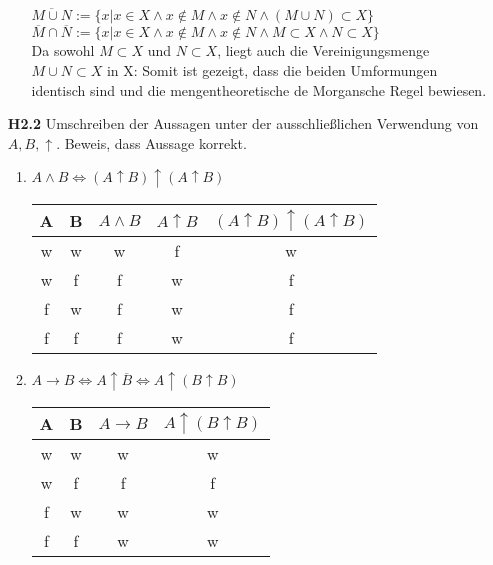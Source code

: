 \documentclass[a4paper,abstract,german]{scrreprt}
\begin{document}
\begin{enumerate}
\begin{enumerate}
        $\overline{M \cup N} := \{x|x \in X \land  x \notin M \land x \notin N \land (M \cup N) \subset X\}$ \\
        $\overline{M} \cap \overline{N} := \{ x |x \in X \land x \notin M \land x \notin N \land M \subset X \land N \subset X \}$ \\ 
        
         Da sowohl $M \subset X$ und $N\subset X$, liegt auch die Vereinigungsmenge $M \cup N \subset X$ in X:
         Somit ist gezeigt, dass die beiden Umformungen identisch sind und die mengentheoretische de Morgansche Regel bewiesen.

	\end{enumerate}
	\item[\textbf {H2.2}]
	Umschreiben der Aussagen unter der ausschließlichen Verwendung von $A, B, \uparrow$. Beweis, dass Aussage korrekt.
	\begin{enumerate}
	\item $ A \land B \iff (A \uparrow B) \uparrow(A \uparrow B)$
	
	\begin{center}
        \begin{tabular}{||c c | c | c | c ||}
         A & B & $ A \land B$ & $A \uparrow B$ & $(A \uparrow B) \uparrow(A \uparrow B)$  \\
         \hline
         w & w & w & f & w \\
         w & f & f & w & f \\
         f & w & f & w & f \\
         f & f & f & w & f \\
        \end{tabular}
        \end{center}
    	
    	
    \item
    	$ A \rightarrow B \iff A \uparrow \overline{B} \iff A \uparrow (B \uparrow B) $ \\
    		\begin{center}
        \begin{tabular}{||c c | c | c ||}
         A & B & $ A \rightarrow B$ & $A \uparrow (B \uparrow B)$  \\
         \hline
         w & w & w & w \\
         w & f & f & f \\
         f & w & w & w \\
         f & f & w & w  \\
        \end{tabular}
        \end{center}
        

\end{enumerate}
\end{enumerate}
\end{document}
